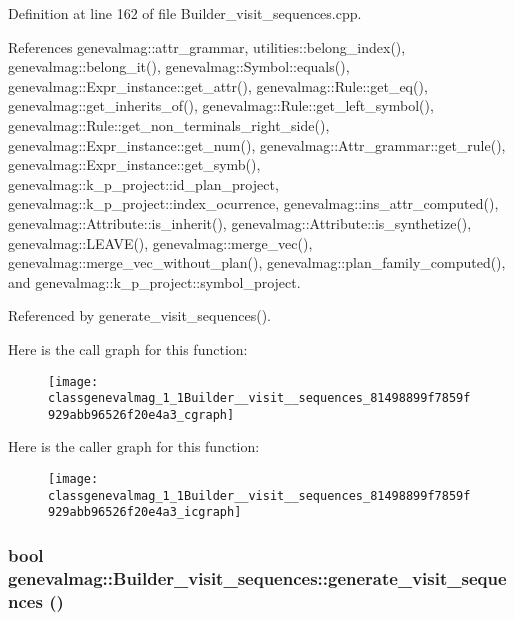 Definition at line 162 of file Builder\_\-visit\_\-sequences.cpp.

References genevalmag::attr\_\-grammar, utilities::belong\_\-index(), genevalmag::belong\_\-it(), genevalmag::Symbol::equals(), genevalmag::Expr\_\-instance::get\_\-attr(), genevalmag::Rule::get\_\-eq(), genevalmag::get\_\-inherits\_\-of(), genevalmag::Rule::get\_\-left\_\-symbol(), genevalmag::Rule::get\_\-non\_\-terminals\_\-right\_\-side(), genevalmag::Expr\_\-instance::get\_\-num(), genevalmag::Attr\_\-grammar::get\_\-rule(), genevalmag::Expr\_\-instance::get\_\-symb(), genevalmag::k\_\-p\_\-project::id\_\-plan\_\-project, genevalmag::k\_\-p\_\-project::index\_\-ocurrence, genevalmag::ins\_\-attr\_\-computed(), genevalmag::Attribute::is\_\-inherit(), genevalmag::Attribute::is\_\-synthetize(), genevalmag::LEAVE(), genevalmag::merge\_\-vec(), genevalmag::merge\_\-vec\_\-without\_\-plan(), genevalmag::plan\_\-family\_\-computed(), and genevalmag::k\_\-p\_\-project::symbol\_\-project.

Referenced by generate\_\-visit\_\-sequences().

Here is the call graph for this function:\nopagebreak
\begin{figure}[H]
\begin{center}
\leavevmode
\texttt{[image: classgenevalmag\_1\_1Builder\_\_visit\_\_sequences\_81498899f7859f929abb96526f20e4a3\_cgraph]}
\end{center}
\end{figure}


Here is the caller graph for this function:\nopagebreak
\begin{figure}[H]
\begin{center}
\leavevmode
\texttt{[image: classgenevalmag\_1\_1Builder\_\_visit\_\_sequences\_81498899f7859f929abb96526f20e4a3\_icgraph]}
\end{center}
\end{figure}
\hypertarget{classgenevalmag_1_1Builder__visit__sequences_2721134ffe1c2677b96a46c4b4d184ef}{
\subsubsection[{generate\_\-visit\_\-sequences}]{\setlength{\rightskip}{0pt plus 5cm}bool genevalmag::Builder\_\-visit\_\-sequences::generate\_\-visit\_\-sequences ()}}
\label{classgenevalmag_1_1Builder__visit__sequences_2721134ffe1c2677b96a46c4b4d184ef}


